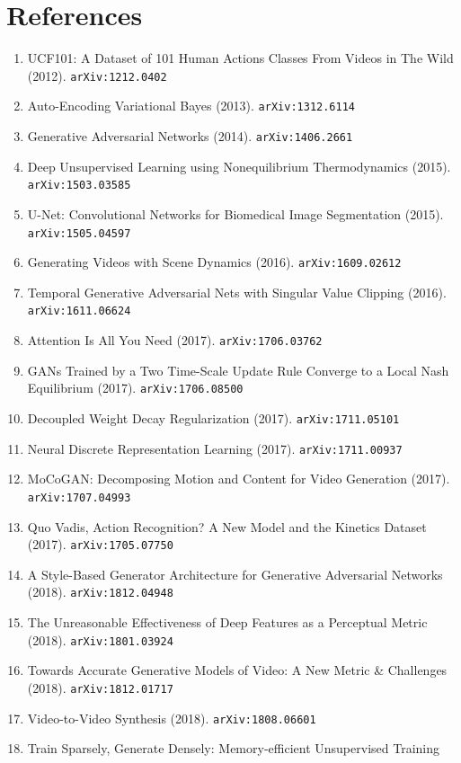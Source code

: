 \documentclass[11pt]{article}
\begin{document}
\section*{References}
\begin{enumerate}\small
  \item UCF101: A Dataset of 101 Human Actions Classes From Videos in The Wild (2012). \texttt{arXiv:1212.0402}
  \item Auto-Encoding Variational Bayes (2013). \texttt{arXiv:1312.6114}
  \item Generative Adversarial Networks (2014). \texttt{arXiv:1406.2661}
  \item Deep Unsupervised Learning using Nonequilibrium Thermodynamics (2015). \texttt{arXiv:1503.03585}
  \item U-Net: Convolutional Networks for Biomedical Image Segmentation (2015). \texttt{arXiv:1505.04597}
  \item Generating Videos with Scene Dynamics (2016). \texttt{arXiv:1609.02612}
  \item Temporal Generative Adversarial Nets with Singular Value Clipping (2016). \texttt{arXiv:1611.06624}
  \item Attention Is All You Need (2017). \texttt{arXiv:1706.03762}
  \item GANs Trained by a Two Time-Scale Update Rule Converge to a Local Nash
  Equilibrium (2017). \texttt{arXiv:1706.08500}
  \item Decoupled Weight Decay Regularization (2017). \texttt{arXiv:1711.05101}
  \item Neural Discrete Representation Learning (2017). \texttt{arXiv:1711.00937}
  \item MoCoGAN: Decomposing Motion and Content for Video Generation (2017). \texttt{arXiv:1707.04993}
  \item Quo Vadis, Action Recognition? A New Model and the Kinetics Dataset (2017). \texttt{arXiv:1705.07750}
  \item A Style-Based Generator Architecture for Generative Adversarial Networks (2018). \texttt{arXiv:1812.04948}
  \item The Unreasonable Effectiveness of Deep Features as a Perceptual Metric (2018). \texttt{arXiv:1801.03924}
  \item Towards Accurate Generative Models of Video: A New Metric \& Challenges (2018). \texttt{arXiv:1812.01717}
  \item Video-to-Video Synthesis (2018). \texttt{arXiv:1808.06601}
  \item Train Sparsely, Generate Densely: Memory-efficient Unsupervised Training

\end{enumerate}
\end{document}
